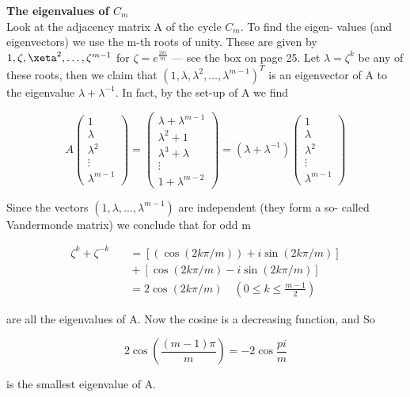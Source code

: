 \documentclass[openany,12pt]{memoir}
\begin{document}
\begin{mdframed}[nobreak=true]
\vspace{8pt}
{\Large\textbf{The eigenvalues of $C_m$}}\\
[5pt]

Look at the adjacency matrix A of the cycle $C_m$. To find the eigen-
values (and eigenvectors) we use the m-th roots of unity. These are 
given by $1, \zeta, \xeta^2, \ldots, \zeta^{m-1}$ for $\zeta = e^{\frac{2\pi i}{m}}$ --- see the box on page 25. 
Let $\lambda = \zeta ^k$  be any of these roots, then we claim that
$(1, \lambda, \lambda^2, \ldots, \lambda^{m-1})^T$  is an eigenvector of A to the eigenvalue $\lambda + \lambda^{-1}$.
In fact, by the set-up of A we find

\[
A \begin{pmatrix} 1 \\ \lambda \\ \lambda^2 \\ \vdots \\ \lambda^{m-1} \end{pmatrix}=
\begin{pmatrix} \lambda + \lambda^{m-1} \\ \lambda^2 + 1 \\ \lambda^3 + \lambda \\ \vdots \\ 1+\lambda^{m-2} \end{pmatrix} =
(\lambda + \lambda^{-1}) \begin{pmatrix} 1 \\ \lambda \\ \lambda^2 \\ \vdots \\ \lambda^{m-1} \end{pmatrix} 
\]

Since the vectors $(1, \lambda, \ldots, \lambda^{m-1})$ are independent (they form a so-
called Vandermonde matrix) we conclude that for odd m

\begin{equation*}
\begin{aligned}
    \zeta^k + \zeta^{-k}&\quad = [(\cos(2k\pi / m)) + i\sin(2k\pi / m)]\\
&\quad + [\cos(2k\pi/m) - i\sin(2k\pi / m)]\\
&\quad =  2\cos(2k\pi / m) \quad (0 \leq k \leq {\frac{m-1}{2}})
\end{aligned}
\end{equation*}

are all the eigenvalues of A. Now the cosine is a decreasing function,
and So

\[
    2\cos({\frac{(m-1)\pi}{m}}) = -2\cos{\frac{pi}{m}}
\]

is the smallest eigenvalue of A. 

\vspace{5pt}
\end{mdframed}


\end{document}
